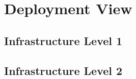 
\chapter{Deployment View}
\label{chap:Deployment View}


\section{Infrastructure Level 1}
\label{sec:Infrastructure Level 1}


\section{Infrastructure Level 2}
\label{sec:Infrastructure Level 2}
